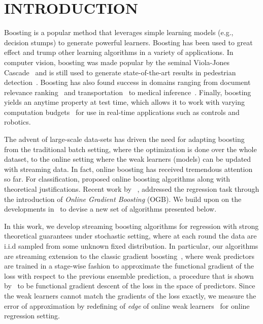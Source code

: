 \section{INTRODUCTION}
\label{sec:sgb_introduction}
Boosting \citep{freund1995desicion} is a popular method that leverages simple learning models (e.g., decision stumps) to generate powerful learners. Boosting has been used to great effect and trump other learning algorithms in a variety of applications. In computer vision, boosting was made popular by the seminal Viola-Jones Cascade~\citep{viola2001rapid} and is still used to generate state-of-the-art results in pedestrian detection~\citep{nam2014local,yang2015convolutional,zhu2016}. Boosting has also found success in domains ranging from document relevance ranking~\citep{yahoo} and transportation~\citep{zhang2015gradient} to medical inference~\citep{atkinson2012assessing}. Finally, boosting yields an anytime property at test time, which allows it to work with varying computation budgets~\citep{grubb2012speedboost} for use in real-time applications such as controls and robotics.

The advent of large-scale data-sets has driven the need for adapting boosting from the traditional batch setting, where the optimization is done over the whole dataset, to the online setting where the weak learners (models) can be updated with streaming data. 
In fact, online boosting has received tremendous attention so far. For classification, \citep{lu:2012,Oza01onlinebagging,beygelzimer2015optimal} proposed online boosting algorithms along with theoretical justifications. Recent work by ~\cite{beygelzimer2015online}, addressed the regression task through the introduction of \emph{Online Gradient Boosting} (OGB). 
We build upon on the developments in~\citep{beygelzimer2015online} to devise a new set of algorithms presented below. 

In this work, we develop streaming boosting algorithms for regression with strong theoretical guarantees under stochastic setting, where at each round the data are i.i.d sampled from some unknown fixed distribution. 
In particular, our algorithms are streaming extension to the classic gradient boosting~\citep{friedman2001greedy}, where weak predictors are trained in a stage-wise fashion to approximate the functional gradient of the loss with respect to the previous ensemble prediction, a procedure that is shown by~\cite{Mason00boostingalgorithms} to be functional gradient descent of the loss in the space of predictors. Since the weak learners cannot match the gradients of the loss exactly, we measure the error of approximation by redefining of \emph{edge} of online weak learners~\citep{beygelzimer2015optimal} for online regression setting. 

